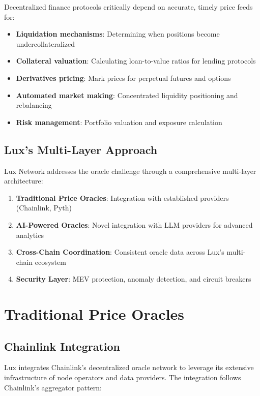 \documentclass[11pt]{article}
\begin{document}
Decentralized finance protocols critically depend on accurate, timely price feeds for:

\begin{itemize}
    \item \textbf{Liquidation mechanisms}: Determining when positions become undercollateralized
    \item \textbf{Collateral valuation}: Calculating loan-to-value ratios for lending protocols
    \item \textbf{Derivatives pricing}: Mark prices for perpetual futures and options
    \item \textbf{Automated market making}: Concentrated liquidity positioning and rebalancing
    \item \textbf{Risk management}: Portfolio valuation and exposure calculation
\end{itemize}

\subsection{Lux's Multi-Layer Approach}

Lux Network addresses the oracle challenge through a comprehensive multi-layer architecture:

\begin{enumerate}
    \item \textbf{Traditional Price Oracles}: Integration with established providers (Chainlink, Pyth)
    \item \textbf{AI-Powered Oracles}: Novel integration with LLM providers for advanced analytics
    \item \textbf{Cross-Chain Coordination}: Consistent oracle data across Lux's multi-chain ecosystem
    \item \textbf{Security Layer}: MEV protection, anomaly detection, and circuit breakers
\end{enumerate}

\section{Traditional Price Oracles}

\subsection{Chainlink Integration}

Lux integrates Chainlink's decentralized oracle network to leverage its extensive infrastructure of node operators and data providers. The integration follows Chainlink's aggregator pattern:
\end{document}
